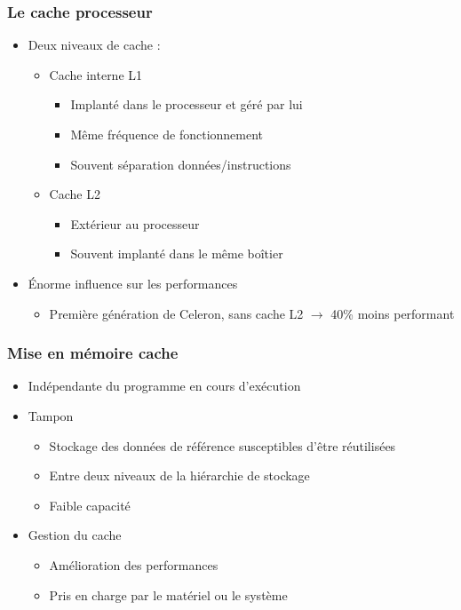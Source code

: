 \begin{frame}
\frametitle{Le cache processeur}
\begin{itemize}
\item Deux niveaux de cache :
\begin{itemize}
\item Cache interne L1
\begin{itemize}
\item Implanté dans le processeur et géré par lui
\item Même fréquence de fonctionnement
\item Souvent séparation données/instructions
\end{itemize}
\item Cache L2
\begin{itemize}
\item Extérieur au processeur
\item Souvent implanté dans le même boîtier
\end{itemize}
\end{itemize}
\item Énorme influence sur les performances
\begin{itemize}
\item Première génération de Celeron, sans cache L2 $\rightarrow$ 40\% moins performant
\end{itemize}
\end{itemize}
\end{frame}

\begin{frame}
\frametitle{Mise en mémoire cache}
\begin{itemize}
\item Indépendante du programme en cours d'exécution
\item Tampon
\begin{itemize}
\item Stockage des données de référence susceptibles d’être réutilisées
\item Entre deux niveaux de la hiérarchie de stockage
\item Faible capacité
\end{itemize}
\item Gestion du cache
\begin{itemize}
\item Amélioration des performances
\item Pris en charge par le matériel ou le système
\end{itemize}
\end{itemize}
\end{frame}



